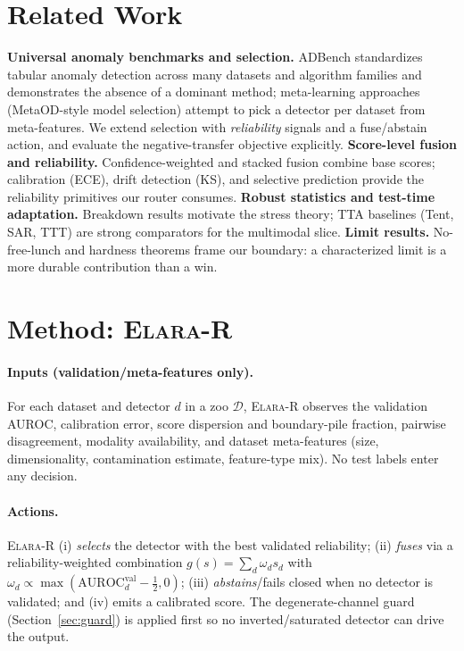\documentclass[11pt]{article}
\newcommand{\router}{\textsc{Elara-R}}
\begin{document}
\section{Related Work}
\textbf{Universal anomaly benchmarks and selection.} ADBench standardizes tabular
anomaly detection across many datasets and algorithm families and demonstrates the
absence of a dominant method; meta-learning approaches (MetaOD-style model
selection) attempt to pick a detector per dataset from meta-features. We extend
selection with \emph{reliability} signals and a fuse/abstain action, and evaluate
the negative-transfer objective explicitly.
\textbf{Score-level fusion and reliability.} Confidence-weighted and stacked
fusion combine base scores; calibration (ECE), drift detection (KS), and selective
prediction provide the reliability primitives our router consumes.
\textbf{Robust statistics and test-time adaptation.} Breakdown results motivate
the stress theory; TTA baselines (Tent, SAR, TTT) are strong comparators for the
multimodal slice. \textbf{Limit results.} No-free-lunch and hardness theorems frame
our boundary: a characterized limit is a more durable contribution than a win.

\section{Method: \router}
\paragraph{Inputs (validation/meta-features only).} For each dataset and detector
$d$ in a zoo $\mathcal{D}$, \router{} observes the validation AUROC, calibration
error, score dispersion and boundary-pile fraction, pairwise disagreement, modality
availability, and dataset meta-features (size, dimensionality, contamination
estimate, feature-type mix). No test labels enter any decision.
\paragraph{Actions.} \router{} (i) \emph{selects} the detector with the best
validated reliability; (ii) \emph{fuses} via a reliability-weighted combination
$g(s)=\sum_d \omega_d s_d$ with $\omega_d \propto \max(\mathrm{AUROC}^{\mathrm{val}}_d
-\tfrac12,0)$; (iii) \emph{abstains}/fails closed when no detector is validated; and
(iv) emits a calibrated score. The degenerate-channel guard (Section~\ref{sec:guard})
is applied first so no inverted/saturated detector can drive the output.
\end{document}
